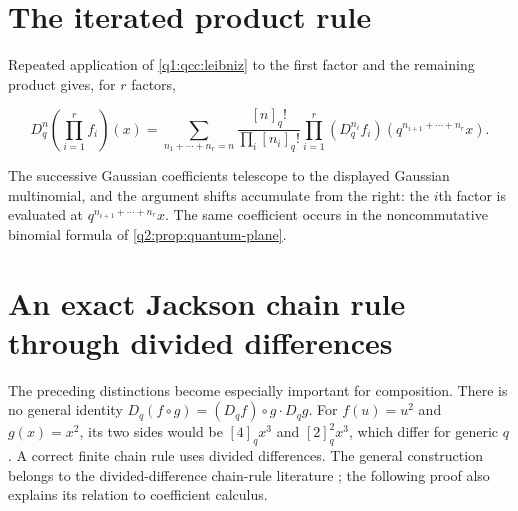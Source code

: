 \documentclass[11pt,a4paper,oneside,openany]{book}
\theoremstyle{definition}
\theoremstyle{remark}
\newcommand{\qnum}[1]{[#1]_q}
\newcommand{\qfac}[1]{[#1]_q!}
\newcommand{\Dq}{D_q}
\begin{document}
\section{The iterated product rule}
Repeated application of \cref{q1:qcc:leibniz} to the first factor and the
remaining product gives, for \(r\) factors,

\begin{equation}
 \Dq^n\!\left(\prod_{i=1}^rf_i\right)(x)
 =\sum_{n_1+\cdots+n_r=n}
    \frac{\qfac n}{\prod_i\qfac{n_i}}
    \prod_{i=1}^r(\Dq^{n_i}f_i)
              \left(q^{n_{i+1}+\cdots+n_r}x\right).
 \label{q3:eq:q-multi-leibniz}
\end{equation}

The successive Gaussian coefficients telescope to the displayed Gaussian
multinomial, and the argument shifts accumulate from the right: the
\(i\)th factor is evaluated at \(q^{n_{i+1}+\cdots+n_r}x\). The same
coefficient occurs in the noncommutative binomial formula of
\cref{q2:prop:quantum-plane}.


\section{An exact Jackson chain rule through divided differences}
\label{q3:sec:chain}
The preceding distinctions become especially important for composition.
There is no general identity
$\Dq(f\circ g)=(\Dq f)\circ g\cdot\Dq g$.
For $f(u)=u^2$ and $g(x)=x^2$, its two sides would be
$\qnum4x^3$ and $\qnum2^2x^3$, which differ for generic $q$.
A correct finite chain rule uses divided differences. The general
construction belongs to the divided-difference chain-rule literature
\cite{floaterlyche}; the following proof also explains its relation to
coefficient calculus.
\end{document}

